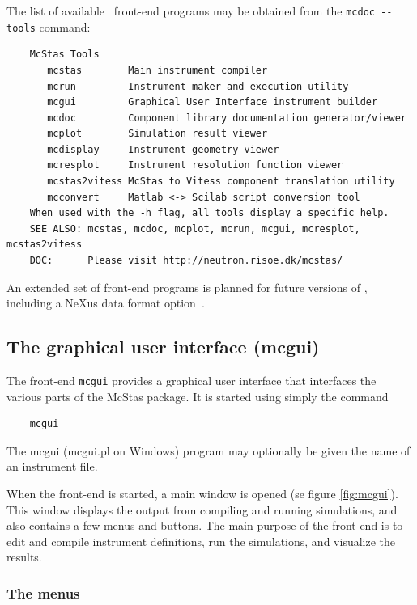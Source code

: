 The list of available \MCS\ front-end programs may be obtained from the \verb+mcdoc --tools+ command:
\begin{verbatim}
    McStas Tools
       mcstas        Main instrument compiler
       mcrun         Instrument maker and execution utility
       mcgui         Graphical User Interface instrument builder
       mcdoc         Component library documentation generator/viewer
       mcplot        Simulation result viewer
       mcdisplay     Instrument geometry viewer
       mcresplot     Instrument resolution function viewer
       mcstas2vitess McStas to Vitess component translation utility
       mcconvert     Matlab <-> Scilab script conversion tool
    When used with the -h flag, all tools display a specific help.
    SEE ALSO: mcstas, mcdoc, mcplot, mcrun, mcgui, mcresplot, mcstas2vitess
    DOC:      Please visit http://neutron.risoe.dk/mcstas/
\end{verbatim}
An extended set of front-end programs is planned for future versions of
\MCS, including a NeXus data format option~\cite{nexus_webpage}.


\subsection{The graphical user interface (mcgui)}
\label{s:mcgui}

The front-end \verb+mcgui+ provides a graphical user interface that
interfaces the various parts of the McStas package. It is started using
simply the command
\begin{verbatim}
    mcgui
\end{verbatim}
The mcgui (mcgui.pl on Windows) program may optionally be given the name of an instrument file.

When the front-end is started, a main window is opened (se figure \ref{fig:mcgui}). This window
displays the output from compiling and running simulations, and also
contains a few menus and buttons. The main purpose of the front-end is
to edit and compile instrument definitions, run the simulations, and
visualize the results.

\subsubsection{The menus}

